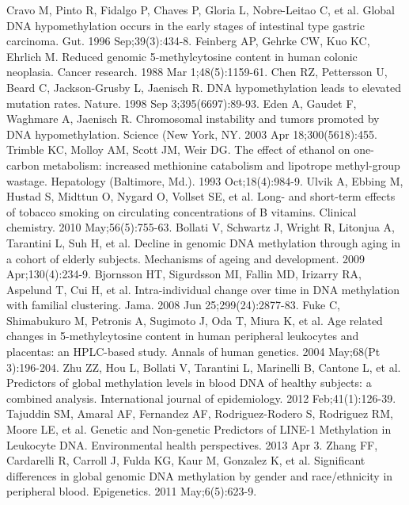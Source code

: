 \begin{thebibliography}{12} 
		Cravo M, Pinto R, Fidalgo P, Chaves P, Gloria L, Nobre-Leitao C, et al. Global DNA hypomethylation occurs in the early stages of intestinal type gastric carcinoma. Gut. 1996 Sep;39(3):434-8. 
		Feinberg AP, Gehrke CW, Kuo KC, Ehrlich M. Reduced genomic 5-methylcytosine content in human colonic neoplasia. Cancer research. 1988 Mar 1;48(5):1159-61. 
		Chen RZ, Pettersson U, Beard C, Jackson-Grusby L, Jaenisch R. DNA hypomethylation leads to elevated mutation rates. Nature. 1998 Sep 3;395(6697):89-93. 
		Eden A, Gaudet F, Waghmare A, Jaenisch R. Chromosomal instability and tumors promoted by DNA hypomethylation. Science (New York, NY. 2003 Apr 18;300(5618):455. 
		Trimble KC, Molloy AM, Scott JM, Weir DG. The effect of ethanol on one-carbon metabolism: increased methionine catabolism and lipotrope methyl-group wastage. Hepatology (Baltimore, Md.). 1993 Oct;18(4):984-9. 
		Ulvik A, Ebbing M, Hustad S, Midttun O, Nygard O, Vollset SE, et al. Long- and short-term effects of tobacco smoking on circulating concentrations of B vitamins. Clinical chemistry. 2010 May;56(5):755-63. 
		Bollati V, Schwartz J, Wright R, Litonjua A, Tarantini L, Suh H, et al. Decline in genomic DNA methylation through aging in a cohort of elderly subjects. Mechanisms of ageing and development. 2009 Apr;130(4):234-9. 
		Bjornsson HT, Sigurdsson MI, Fallin MD, Irizarry RA, Aspelund T, Cui H, et al. Intra-individual change over time in DNA methylation with familial clustering. Jama. 2008 Jun 25;299(24):2877-83. 
		Fuke C, Shimabukuro M, Petronis A, Sugimoto J, Oda T, Miura K, et al. Age related changes in 5-methylcytosine content in human peripheral leukocytes and placentas: an HPLC-based study. Annals of human genetics. 2004 May;68(Pt 3):196-204. 
		Zhu ZZ, Hou L, Bollati V, Tarantini L, Marinelli B, Cantone L, et al. Predictors of global methylation levels in blood DNA of healthy subjects: a combined analysis. International journal of epidemiology. 2012 Feb;41(1):126-39. 
		Tajuddin SM, Amaral AF, Fernandez AF, Rodriguez-Rodero S, Rodriguez RM, Moore LE, et al. Genetic and Non-genetic Predictors of LINE-1 Methylation in Leukocyte DNA. Environmental health perspectives. 2013 Apr 3. 
		Zhang FF, Cardarelli R, Carroll J, Fulda KG, Kaur M, Gonzalez K, et al. Significant differences in global genomic DNA methylation by gender and race/ethnicity in peripheral blood. Epigenetics. 2011 May;6(5):623-9. 

\end{thebibliography}
